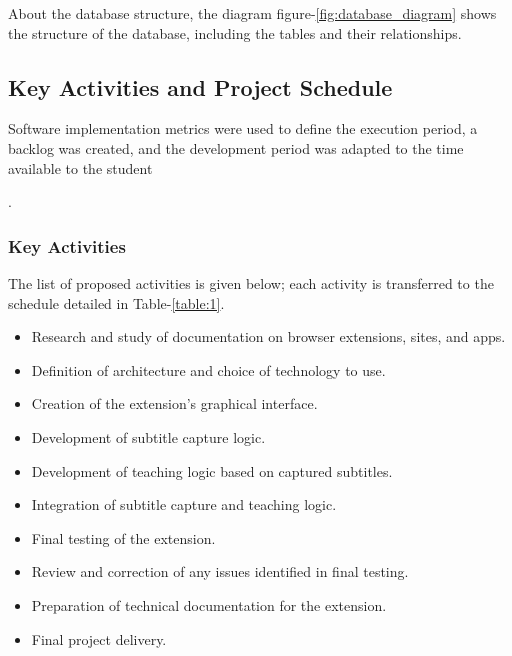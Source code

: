 \documentclass[12pt]{article}
\begin{document}
About the database structure, the diagram figure-\ref{fig:database_diagram} shows the structure of the database, including the tables and their relationships.





\subsection{Key Activities and Project Schedule}

Software implementation metrics were used to define the execution period, a backlog was created, and the development period was adapted to the time available to the student \author{J. Emanuel Cascone R. S.}.

\subsubsection{Key Activities}

The list of proposed activities is given below; each activity is transferred to the schedule detailed in Table-\ref{table:1}.

\begin{itemize}
\item Research and study of documentation on browser extensions, sites, and apps.
\item Definition of architecture and choice of technology to use.
\item Creation of the extension's graphical interface.
\item Development of subtitle capture logic.
\item Development of teaching logic based on captured subtitles.
\item Integration of subtitle capture and teaching logic.
\item Final testing of the extension.
\item Review and correction of any issues identified in final testing.
\item Preparation of technical documentation for the extension.
\item Final project delivery.
\end{itemize}
\end{document}
